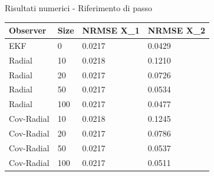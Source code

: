 \documentclass{beamer}
\begin{document}
\begin{frame}{Risultati numerici - Riferimento di passo}
    \begin{table}[]
        \begin{tabular}{|llll|}
        \hline
        \textbf{Observer} & \textbf{Size} & \textbf{NRMSE X\_1} & \textbf{NRMSE X\_2} \\    \hline
        EKF         &   0   &   0.0217  &   0.0429  \\  \hline
        Radial      &   10  &   0.0218  &   0.1210  \\
        Radial      &   20  &   0.0217  &   0.0726  \\
        Radial      &   50  &   0.0217  &   0.0534  \\
        Radial      &   100 &   0.0217  &   0.0477  \\  \hline
        Cov-Radial  &   10  &   0.0218  &   0.1245  \\
        Cov-Radial  &   20  &   0.0217  &   0.0786  \\
        Cov-Radial  &   50  &   0.0217  &   0.0537  \\
        Cov-Radial  &   100 &   0.0217  &   0.0511  \\ \hline
        \end{tabular}
        \end{table}
\end{frame}
\end{document}
